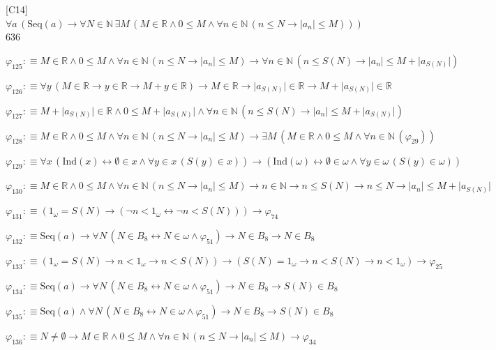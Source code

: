 \begin{fullproof}{[C14]}{$\forall a\,(\mathrm{Seq}(a) \to \forall N \in \mathbb{N}\,\exists M\,(M \in \mathbb{R} \land 0 \leq M \land \forall n \in \mathbb{N}\,(n \leq N \to \lvert a_{n} \rvert \leq M)))$}{636}
\begin{abbrevlist}
\item $\varphi_{125} :\equiv M \in \mathbb{R} \land 0 \leq M \land \forall n \in \mathbb{N}\,(n \leq N \to \lvert a_{n} \rvert \leq M) \to \forall n \in \mathbb{N}\,(n \leq S(N) \to \lvert a_{n} \rvert \leq M + \lvert a_{S(N)} \rvert)$
\item $\varphi_{126} :\equiv \forall y\,(M \in \mathbb{R} \to y \in \mathbb{R} \to M + y \in \mathbb{R}) \to M \in \mathbb{R} \to \lvert a_{S(N)} \rvert \in \mathbb{R} \to M + \lvert a_{S(N)} \rvert \in \mathbb{R}$
\item $\varphi_{127} :\equiv M + \lvert a_{S(N)} \rvert \in \mathbb{R} \land 0 \leq M + \lvert a_{S(N)} \rvert \land \forall n \in \mathbb{N}\,(n \leq S(N) \to \lvert a_{n} \rvert \leq M + \lvert a_{S(N)} \rvert)$
\item $\varphi_{128} :\equiv M \in \mathbb{R} \land 0 \leq M \land \forall n \in \mathbb{N}\,(n \leq N \to \lvert a_{n} \rvert \leq M) \to \exists M\,(M \in \mathbb{R} \land 0 \leq M \land \forall n \in \mathbb{N}\,(\varphi_{29}))$
\item $\varphi_{129} :\equiv \forall x\,(\mathrm{Ind}(x) \leftrightarrow \emptyset \in x \land \forall y \in x\,(S(y) \in x)) \to (\mathrm{Ind}(\omega) \leftrightarrow \emptyset \in \omega \land \forall y \in \omega\,(S(y) \in \omega))$
\item $\varphi_{130} :\equiv M \in \mathbb{R} \land 0 \leq M \land \forall n \in \mathbb{N}\,(n \leq N \to \lvert a_{n} \rvert \leq M) \to n \in \mathbb{N} \to n \leq S(N) \to n \leq N \to \lvert a_{n} \rvert \leq M + \lvert a_{S(N)} \rvert$
\item $\varphi_{131} :\equiv (1_{\omega} = S(N) \to (\neg n < 1_{\omega} \leftrightarrow \neg n < S(N))) \to \varphi_{74}$
\item $\varphi_{132} :\equiv \mathrm{Seq}(a) \to \forall N\,(N \in B_{8} \leftrightarrow N \in \omega \land \varphi_{51}) \to N \in B_{8} \to N \in B_{8}$
\item $\varphi_{133} :\equiv (1_{\omega} = S(N) \to n < 1_{\omega} \to n < S(N)) \to (S(N) = 1_{\omega} \to n < S(N) \to n < 1_{\omega}) \to \varphi_{25}$
\item $\varphi_{134} :\equiv \mathrm{Seq}(a) \to \forall N\,(N \in B_{8} \leftrightarrow N \in \omega \land \varphi_{51}) \to N \in B_{8} \to S(N) \in B_{8}$
\item $\varphi_{135} :\equiv \mathrm{Seq}(a) \land \forall N\,(N \in B_{8} \leftrightarrow N \in \omega \land \varphi_{51}) \to N \in B_{8} \to S(N) \in B_{8}$
\item $\varphi_{136} :\equiv N \neq \emptyset \to M \in \mathbb{R} \land 0 \leq M \land \forall n \in \mathbb{N}\,(n \leq N \to \lvert a_{n} \rvert \leq M) \to \varphi_{34}$

\end{abbrevlist}
\end{fullproof}
